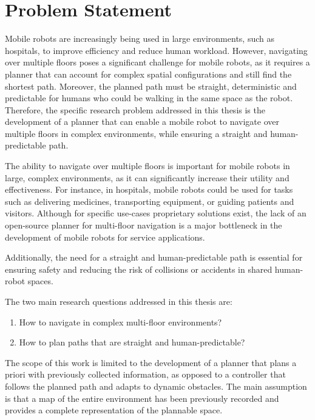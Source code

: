 \section{Problem Statement}
\label{sec:problem_statement}
Mobile robots are increasingly being used in large environments, such as hospitals, to improve efficiency and reduce human workload. However, navigating over multiple floors poses a significant challenge for mobile robots, as it requires a planner that can account for complex spatial configurations and still find the shortest path. Moreover, the planned path must be straight, deterministic and predictable for humans who could be walking in the same space as the robot. Therefore, the specific research problem addressed in this thesis is the development of a planner that can enable a mobile robot to navigate over multiple floors in complex environments, while ensuring a straight and human-predictable path. 

The ability to navigate over multiple floors is important for mobile robots in large, complex environments, as it can significantly increase their utility and effectiveness. For instance, in hospitals, mobile robots could be used for tasks such as delivering medicines, transporting equipment, or guiding patients and visitors. Although for specific use-cases proprietary solutions exist, the lack of an open-source planner for multi-floor navigation is a major bottleneck in the development of mobile robots for service applications. 

Additionally, the need for a straight and human-predictable path is essential for ensuring safety and reducing the risk of collisions or accidents in shared human-robot spaces. 

The two main research questions addressed in this thesis are:
\begin{enumerate}
    \item How to navigate in complex multi-floor environments?
    \item How to plan paths that are straight and human-predictable?
\end{enumerate}

The scope of this work is limited to the development of a planner that plans a priori with previously collected information, as opposed to a controller that follows the planned path and adapts to dynamic obstacles. The main assumption is that a map of the entire environment has been previously recorded and provides a complete representation of the plannable space.

